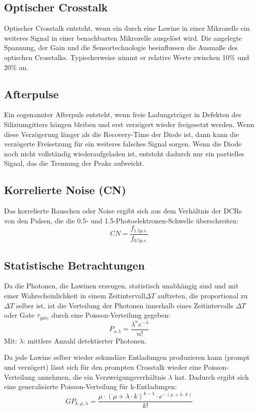 \documentclass[12pt]{article}
\begin{document}
\subsection{Optischer Crosstalk}
Optischer Crosstalk entsteht, wenn ein durch eine Lawine in einer Mikrozelle ein weiteres Signal in einer benachbarten Mikrozelle ausgelöst wird.
Die angelegte Spannung, der Gain und die Sensortechnologie beeinflussen die Ausmaße des optischen Crosstalks.
Typischerweise nimmt er relative Werte zwischen 10\% und 20\% an.
\subsection{Afterpulse}
\label{AfterpulseErkl}
Ein sogenannter Afterpuls entsteht, wenn freie Ladungsträger in Defekten des Siliziumgitters hängen bleiben und erst verzögert wieder freigesetzt werden.
Wenn diese Verzögerung länger als die Recovery-Time der Diode ist, dann kann die verzögerte Freisetzung für ein weiteres falsches Signal sorgen.
Wenn die Diode noch nicht vollständig wiederaufgeladen ist, entsteht dadurch nur ein partielles Signal, das die Trennung der Peaks aufweicht.

\subsection{Korrelierte Noise (CN)}
Das korrelierte Rauschen oder Noise ergibt sich aus dem Verhältnis der DCRs von den Pulsen, die die 0.5- und 1.5-Photoelektronen-Schwelle überschreiten:
\begin{equation}
    CN = \frac{f_{1.5 p.e.}}{f_{0.5 p.e.}}
    \label{CN}
\end{equation}
\subsection{Statistische Betrachtungen}
Da die Photonen, die Lawinen erzeugen, statistisch unabhängig sind und mit einer Wahrscheinlichkeit in einem Zeitintervall$\Delta T$ auftreten, die proportional zu $\Delta T$ selber ist, ist die Verteilung der Photonen innerhalb eines Zeitintervalls $\Delta T$ oder Gate $\tau_{gate}$ durch eine Poisson-Verteilung gegeben:
\begin{equation}
P_{n.\lambda} = \frac{\lambda^{n}e^{-\lambda}}{n!}
\end{equation}
Mit: $\lambda$: mittlere Anzahl detektierter Photonen.

Da jede Lawine selber wieder sekundäre Entladungen produzieren kann (prompt und verzögert) lässt sich für den prompten Crosstalk wieder eine Poisson-Verteilung annehmen, die ein Verzweigungsverhältnis $\lambda$ hat. Dadurch ergibt sich eine generalisierte Poisson-Verteilung für k-Entladungen:
\begin{equation}
GP_{k,\mu,\lambda}=\frac{\mu \cdot (\mu+\lambda \cdot k)^{k-1} \cdot e^{-(\mu+\lambda \cdot k)}}{k!}
\end{equation}
\end{document}
